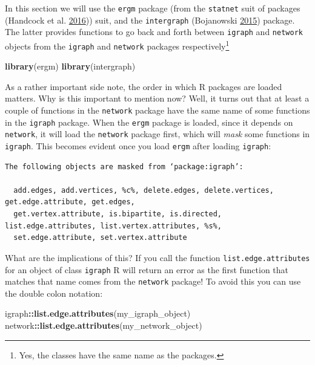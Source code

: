 \documentclass[]{book}
\newenvironment{Shaded}{\begin{snugshade}}{\end{snugshade}}
\newcommand{\KeywordTok}[1]{\textcolor[rgb]{0.13,0.29,0.53}{\textbf{#1}}}
\newcommand{\OperatorTok}[1]{\textcolor[rgb]{0.81,0.36,0.00}{\textbf{#1}}}
\newcommand{\NormalTok}[1]{#1}
\let\rmarkdownfootnote\footnote%
\def\footnote{\protect\rmarkdownfootnote}
\theoremstyle{definition}
\theoremstyle{definition}
\theoremstyle{definition}
\theoremstyle{remark}
\begin{document}
In this section we will use the \texttt{ergm} package (from the
\texttt{statnet} suit of packages (Handcock et al.
\protect\hyperlink{ref-R-statnet}{2016})) suit, and the
\texttt{intergraph} (Bojanowski
\protect\hyperlink{ref-R-intergraph}{2015}) package. The latter provides
functions to go back and forth between \texttt{igraph} and
\texttt{network} objects from the \texttt{igraph} and \texttt{network}
packages respectively\footnote{Yes, the classes have the same name as
  the packages.}

\begin{Shaded}
\begin{Highlighting}[]
\KeywordTok{library}\NormalTok{(ergm)}
\KeywordTok{library}\NormalTok{(intergraph)}
\end{Highlighting}
\end{Shaded}

As a rather important side note, the order in which R packages are
loaded matters. Why is this important to mention now? Well, it turns out
that at least a couple of functions in the \texttt{network} package have
the same name of some functions in the \texttt{igraph} package. When the
\texttt{ergm} package is loaded, since it depends on \texttt{network},
it will load the \texttt{network} package first, which will \emph{mask}
some functions in \texttt{igraph}. This becomes evident once you load
\texttt{ergm} after loading \texttt{igraph}:

\begin{verbatim}
The following objects are masked from ‘package:igraph’:

  add.edges, add.vertices, %c%, delete.edges, delete.vertices, get.edge.attribute, get.edges,
  get.vertex.attribute, is.bipartite, is.directed, list.edge.attributes, list.vertex.attributes, %s%,
  set.edge.attribute, set.vertex.attribute
\end{verbatim}

What are the implications of this? If you call the function
\texttt{list.edge.attributes} for an object of class \texttt{igraph} R
will return an error as the first function that matches that name comes
from the \texttt{network} package! To avoid this you can use the double
colon notation:

\begin{Shaded}
\begin{Highlighting}[]
\NormalTok{igraph}\OperatorTok{::}\KeywordTok{list.edge.attributes}\NormalTok{(my_igraph_object)}
\NormalTok{network}\OperatorTok{::}\KeywordTok{list.edge.attributes}\NormalTok{(my_network_object)}
\end{Highlighting}
\end{Shaded}
\end{document}
